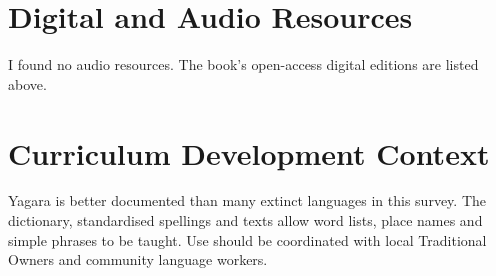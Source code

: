 \documentclass[12pt]{article}
\begin{document}
\section{Digital and Audio Resources}
I found no audio resources. The book's open-access digital editions are listed above.

\section{Curriculum Development Context}
Yagara is better documented than many extinct languages in this survey. The dictionary, standardised spellings and texts allow word lists, place names and simple phrases to be taught. Use should be coordinated with local Traditional Owners and community language workers.
\end{document}
